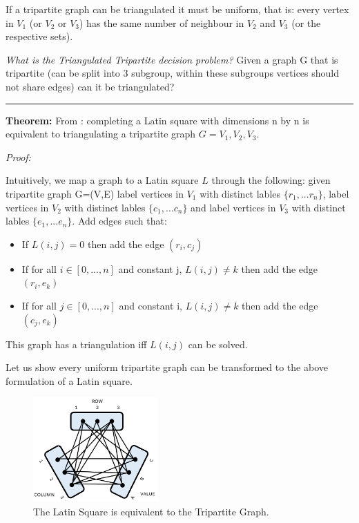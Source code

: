 \documentclass[a4paper,11pt]{report}
\newcounter{row}
\newcounter{col}
\newcounter{rowb}
\newcounter{colb}
\newcommand\setrowb[3]{
  \setcounter{colb}{1}
  \foreach \n in {#1, #2, #3} {
    \edef\x{\value{colb} - 0.5}
    \edef\y{3.5 - \value{rowb}}
    \node[anchor=center] at (\x, \y) {\n};
    \stepcounter{colb}
  }
  \stepcounter{rowb}
}
\begin{document}
If a tripartite graph can be triangulated it must be uniform, that is: every vertex in $V_1$ (or $V_2$ or $V_3$) has the same number of neighbour in $V_2$ and $V_3$ (or the respective sets).

\textit{What is the Triangulated Tripartite decision problem?} Given a graph G that is tripartite (can be split into 3 subgroup, within these subgroups vertices should not share edges) can it be triangulated?

\noindent\rule{4cm}{0.4pt}

\textbf{Theorem:} From \cite{lsttg}: completing a Latin square with dimensions n by n is equivalent to triangulating a tripartite graph $G= V_1, V_2, V_3$.

\textit{Proof:} 

Intuitively, we map a graph to a Latin square $L$ through the following: 
given tripartite graph G=(V,E) label vertices in $V_1$ with distinct lables $\{r_1,...r_n\}$, label vertices in $V_2$ with distinct lables $\{c_1,...c_n\}$ and label vertices in $V_3$ with distinct lables $\{e_1,...e_n\}$. Add edges such that:
\begin{itemize}
\item{If $L(i,j) = 0$ then add the edge $(r_i,c_j)$ }
\item{If for all $i \in [0,...,n]$ and constant j, $L(i,j) \neq k$ then add the edge $(r_i,e_k)$}
\item{If for all $j \in [0,...,n]$ and constant i, $L(i,j) \neq k$ then add the edge $(c_j,e_k)$}
\end{itemize}
This graph has a triangulation iff $L(i,j)$ can be solved.

Let us show every uniform tripartite graph can be transformed to the above formulation of a Latin square.

\begin{figure}[h!]
\centering
{}

\includegraphics[height=40mm]{figures/ttg.png}
\caption{The Latin Square is equivalent to the Tripartite Graph.}
\end{figure}
\end{document}
